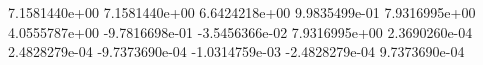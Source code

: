 7.1581440e+00
7.1581440e+00
6.6424218e+00
9.9835499e-01
7.9316995e+00
4.0555787e+00
-9.7816698e-01
-3.5456366e-02
7.9316995e+00
2.3690260e-04
2.4828279e-04
-9.7373690e-04
-1.0314759e-03
-2.4828279e-04
9.7373690e-04
